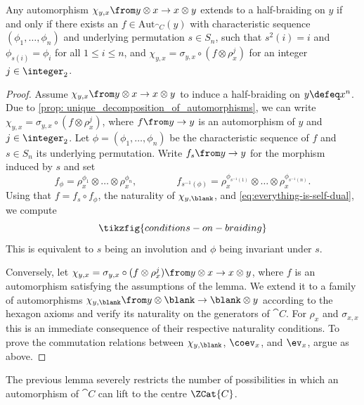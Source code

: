 \begin{lemma}\label{lem: half-braidings_on_C}
  Any automorphism \(\chi_{y, x} \from y \otimes x \to x \otimes y\) extends to a half-braiding on \(y\) if and only if
  there exists an \(f \in \mathrm{Aut}_{\cat{C}}(y)\) with characteristic sequence \((\phi_1, \dots, \phi_n)\) and underlying permutation \(s \in S_n\),
  such that
  \(s^2(i) = i\) and \(\phi_{s(i)} = \phi_i\)
  for all \(1 \leq i \leq n\),
  and \(\chi_{y, x}= \sigma_{y,x}\circ (f\otimes \rho_x^j)\) for an integer \(j \in \integer_2\).
\end{lemma}
\begin{proof}
  Assume \(\chi_{y, x} \from y \otimes x \to x \otimes y\) to induce a half-braiding on \(y \defeq x^n\).
  Due to \cref{prop: unique_decomposition_of_automorphisms},
  we can write \(\chi_{y, x}= \sigma_{y,x} \circ (f \otimes \rho_x^j)\),
  where \(f\from y \to y\) is an automorphism of \(y\) and \(j \in \integer_2\).
  Let \(\phi = (\phi_1, \dots, \phi_n)\) be the characteristic sequence of \(f\) and \(s \in S_{n}\) its underlying permutation.
  Write \(f_s\from y \to y\) for the morphism induced by \(s\) and set
  \[
    f_\phi = \rho_x^{\phi_1} \otimes \dots \otimes \rho_x^{\phi_n}, \qquad \qquad
    f_{s^{-1}(\phi)} = \rho_x^{\phi_{s^{-1}(1)}} \otimes \dots \otimes \rho_x^{\phi_{s^{-1}(n)}}.
  \]
  Using that \(f= f_s \circ f_\phi\), the naturality of \(\chi_{y, \blank}\), and \cref{eq:everything-is-self-dual}, we compute
  \[
    \tikzfig{conditions-on-braiding}
  \]
  This is equivalent to \(s\) being an involution and \(\phi\) being invariant under \(s\).

  Conversely, let \(\chi_{y, x}= \sigma_{y,x} \circ (f \otimes \rho_x^j) \from y \otimes x \to x \otimes y\),
  where \(f\) is an automorphism satisfying the assumptions of the lemma.
  We extend it to a family of automorphisms \(\chi_{y, \blank} \from y \otimes \blank \to \blank \otimes y\)
  according to the hexagon axioms and verify its naturality on the generators of \(\cat{C}\).
  For \(\rho_x\) and \(\sigma_{x,x}\) this is an immediate consequence of their respective naturality conditions.
  To prove the commutation relations between \(\chi_{y, \blank}\), \(\coev_x\), and \(\ev_x\),
  argue as above.
\end{proof}

The previous lemma severely restricts the number of possibilities in which an automorphism of \(\cat{C}\) can lift to the centre \(\ZCat{C}\).

